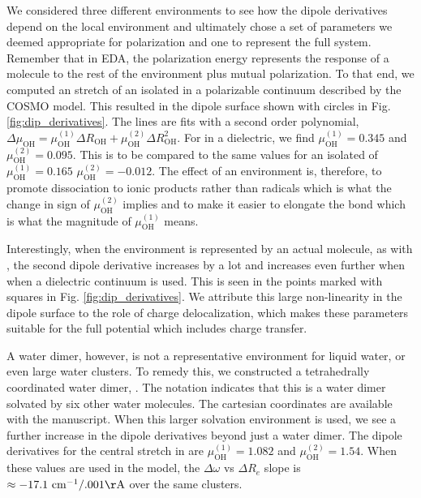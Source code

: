 \documentclass[12pt,letter]{article}
\begin{document}
We considered three different environments to see how the dipole derivatives depend on the
local environment and ultimately chose a set of parameters we deemed appropriate for
polarization and one to represent the full system. Remember that in EDA, the polarization
energy represents the response of a molecule to the rest of the environment plus mutual
polarization. To that end, we computed an  stretch of an isolated  in
a polarizable continuum described by the COSMO model.\cite{klamt2011cosmo} This resulted
in the dipole surface shown with circles in Fig. \ref{fig:dip_derivatives}. The lines
are fits with a second order polynomial,
$\Delta\mu_{\mathrm{OH}}=\mu_{\mathrm{OH}}^{(1)}\Delta R_{\mathrm{OH}}+\mu_{\mathrm{OH}}^{(2)}\Delta R_{\mathrm{OH}}^2$.
For  in a dielectric, we find $\mu_{\mathrm{OH}}^{(1)}=0.345$ and $\mu_{\mathrm{OH}}^{(2)}=0.095$. This
is to be compared to the same values for an isolated  of $\mu_{\mathrm{OH}}^{(1)}=0.165$ $\mu_{\mathrm{OH}}^{(2)}=-0.012$.
The effect of an environment is, therefore, to promote dissociation to ionic products rather than
radicals which is what the change in sign of $\mu_{\mathrm{OH}}^{(2)}$ implies and to make it easier
to elongate the  bond which is what the magnitude of $\mu_{\mathrm{OH}}^{(1)}$ means.

Interestingly, when the environment is represented by an actual molecule, as with ,
the second dipole derivative increases by a lot and increases even further when when a dielectric
continuum is used. This is seen in the points marked with squares in Fig. \ref{fig:dip_derivatives}.
We attribute this large non-linearity in the dipole surface to the role of charge delocalization,
which makes these parameters suitable for the full potential which includes charge transfer.

A water dimer, however, is not a representative environment for liquid water, or even large
water clusters. To remedy this, we constructed a tetrahedrally coordinated water dimer, .
The notation  indicates that this is a water dimer solvated by six other water
molecules. The cartesian coordinates are available with the manuscript. When this larger solvation environment
is used, we see a further increase in the dipole derivatives beyond just a water dimer.
The dipole derivatives for the central  stretch in  are $\mu_{\mathrm{OH}}^{(1)}=1.082$ and
$\mu_{\mathrm{OH}}^{(2)}=1.54$. When these values are used in the model, the
$\Delta\omega$ vs $\Delta R_e$ slope is $\approx -17.1\ \mathrm{cm^{-1}/.001\AA}$ over the same clusters.
\end{document}
